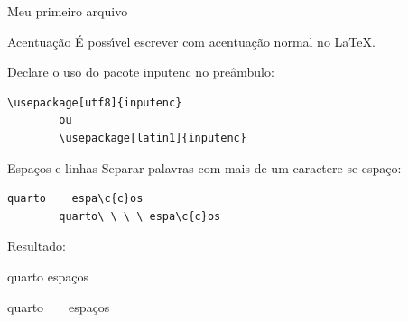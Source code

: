 \documentclass{beamer}
\newcommand{\tbs}{\textbackslash}
\begin{document}

\begin{frame}{Meu primeiro arquivo}
    
\end{frame}

\begin{frame}[fragile]{Acentua\c{c}\~ao}
    \'E poss\'{\i}vel escrever com acentua\c{c}\~ao normal no \LaTeX.

    \vspace{1cm}
    Declare o uso do pacote inputenc no pre\^ambulo:
    \begin{lstlisting}[style=limpo]
        \usepackage[utf8]{inputenc}
        ou
        \usepackage[latin1]{inputenc}
    \end{lstlisting}
\end{frame}

\begin{frame}[fragile]{Espa\c{c}os e linhas}
    Separar palavras com mais de um caractere se espa\c{c}o:
    \begin{lstlisting}[style=limpo]
        quarto    espa\c{c}os
        quarto\ \ \ \ espa\c{c}os
    \end{lstlisting}

    Resultado:
    \begin{center}
        quarto    espa\c{c}os

        quarto\ \ \ \ espa\c{c}os
    \end{center}
\end{frame}
\end{document}
